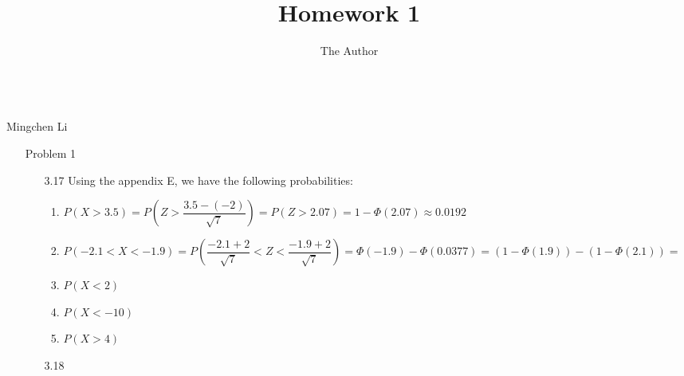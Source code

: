 \documentclass[11pt, oneside]{article}
\title{Homework 1}
\author{The Author}
\begin{document}
\begin{center}\\Mingchen Li\\ \end{center}

\begin{enumerate}
\item[Problem 1]
\begin{itemize}
    
    \item[3.17] Using the appendix E, we have the following probabilities:
    \begin{enumerate}
        \item $P(X>3.5)=P(Z>\dfrac{3.5-(-2)}{\sqrt{7}})=P(Z>2.07)=1-\Phi(2.07)\approx 0.0192$
        \item $P(-2.1<X<-1.9)=P(\dfrac{-2.1+2}{\sqrt{7}}<Z<\dfrac{-1.9+2}{\sqrt{7}})=\Phi(-1.9)-\Phi(0.0377)=(1-\Phi(1.9))-(1-\Phi(2.1))= $
        \item $P(X<2)$
        \item $P(X<-10)$
        \item $P(X>4)$
    \end{enumerate}
       
    \item[3.18]
\end{itemize}
\end{enumerate}
\end{document}
